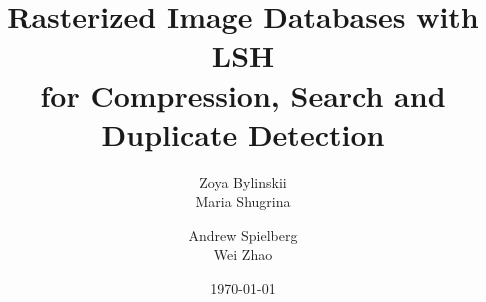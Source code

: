 \documentclass{vldb}
\begin{document}

\title{Rasterized Image Databases with LSH\\
for Compression, Search and Duplicate Detection}



%
%
%
%


\author{
%
%
\alignauthor
Zoya Bylinskii\\
\alignauthor
Maria Shugrina\\
\and  %
\alignauthor
Andrew Spielberg\\
\alignauthor
Wei Zhao\\
}
\date{\today}
\end{document}
